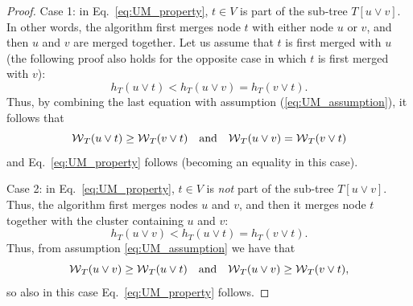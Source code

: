 \begin{proof}
Case 1: in Eq.~\ref{eq:UM_property}, $t\in V$ is part of the sub-tree ${T[u \vee v]}$. In other words, the algorithm first merges node $t$ with either node $u$ or $v$, and then $u$ and $v$ are merged together. Let us assume that $t$ is first merged with $u$ (the following proof also holds for the opposite case in which $t$ is first merged with $v$):
\begin{equation}\label{eq:case_1}
h_T(u \vee t) < h_T(u \vee v) = h_T(v \vee t).
\end{equation}
Thus, by combining the last equation with assumption (\ref{eq:UM_assumption}), it follows that
\begin{equation}
\mathcal{W}{}_{T}(u \vee t) \geq \mathcal{W}{}_{T}(v \vee t) \quad  \text{and} \quad \mathcal{W}{}_{T}(u \vee v) = \mathcal{W}{}_{T}(v \vee t)
\end{equation}
and Eq.~\ref{eq:UM_property} follows (becoming an equality in this case).

Case 2: in Eq.~\ref{eq:UM_property}, $t\in V$ is \emph{not} part of the sub-tree ${T[u \vee v]}$. Thus, the algorithm first merges nodes $u$ and $v$, and then it merges node $t$ together with the cluster containing $u$ and $v$:
\begin{equation}
h_T(u \vee v) < h_T(u \vee t) = h_T(v \vee t).
\end{equation}
Thus, from assumption \ref{eq:UM_assumption} we have that
\begin{equation}
\mathcal{W}{}_{T}(u \vee v) \geq \mathcal{W}{}_{T}(u \vee t) \quad  \text{and} \quad \mathcal{W}{}_{T}(u \vee v) \geq \mathcal{W}{}_{T}(v \vee t),
\end{equation}
so also in this case Eq.~\ref{eq:UM_property} follows.


\end{proof}
